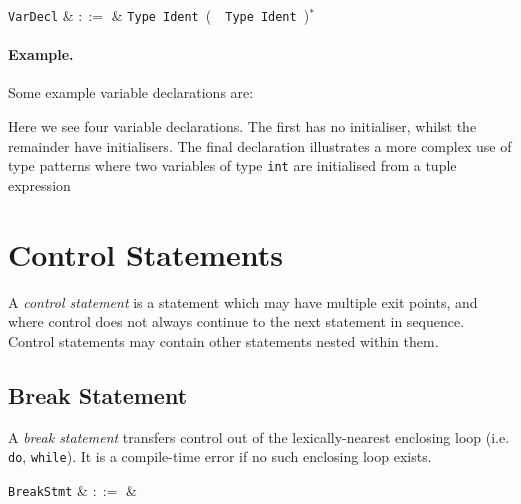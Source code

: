 \begin{syntax}
  \verb+VarDecl+ & $::=$ & \verb+Type+\ \verb+Ident+\ \big(\ \token{,}\ \verb+Type+\ \verb+Ident+\ \big)$^*$\ \big[\
  \token{=}\ \verb+Expr+\ \big(\ \token{,}\ \verb+Expr+\ \big)$^*$\ \big]\\
\end{syntax}

\paragraph{Example.} Some example variable declarations are:



Here we see four variable declarations.  The first has no initialiser, whilst the remainder have initialisers.  The final declaration illustrates a more complex use of type patterns where two variables of type \lstinline{int} are initialised from a tuple expression


\section{Control Statements}

A {\em control statement} is a statement which may have multiple exit points, and where control does not always continue to the next statement in sequence.  Control statements may contain other statements nested within them.



\subsection{Break Statement}
\label{c_stmts_break}
A {\em break statement} transfers control out of the lexically-nearest enclosing loop (i.e. \lstinline{do}, \lstinline{while}).  It is a compile-time error if no such enclosing loop exists.

\begin{syntax}
  \verb+BreakStmt+ & $::=$ & \\
\end{syntax}

